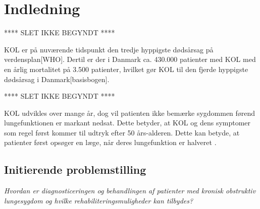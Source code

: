 \chapter{Indledning}
 
 **** SLET IKKE BEGYNDT ****

KOL er på nuværende tidspunkt den tredje hyppigste dødsårsag på verdensplan[WHO]. Dertil er der i Danmark ca. 430.000 patienter med KOL med en årlig mortalitet på 3.500 patienter, hvilket gør KOL til den fjerde hyppigste dødsårsag i Danmark[basisbogen].


 **** SLET IKKE BEGYNDT ****

KOL udvikles over mange år, dog vil patienten ikke bemærke sygdommen førend lungefunktionen er markant nedsat. Dette betyder, at KOL og dens symptomer som regel først kommer til udtryk efter 50 års-alderen\cite{Lange2015}. Dette kan betyde, at patienter først opsøger en læge, når deres lungefunktion er halveret \cite{dsam2016}. 


\section{Initierende problemstilling}
\textit{Hvordan er diagnosticeringen og behandlingen af patienter med kronisk obstruktiv lungesygdom og hvilke rehabiliteringsmuligheder kan tilbydes?}